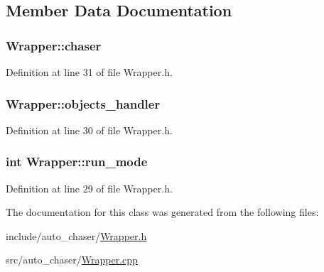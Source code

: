\subsection{Member Data Documentation}
\subsubsection[{\texorpdfstring{chaser}{chaser}}]{ Wrapper\+::chaser}\hypertarget{class_wrapper_a750309ad3470e20a80e9d72b0d7e34cb}{}\label{class_wrapper_a750309ad3470e20a80e9d72b0d7e34cb}


Definition at line 31 of file Wrapper.\+h.

\subsubsection[{\texorpdfstring{objects\+\_\+handler}{objects_handler}}]{ Wrapper\+::objects\+\_\+handler}\hypertarget{class_wrapper_a8cddd5ffbaeb5ab0b5d8d8d0c74f810f}{}\label{class_wrapper_a8cddd5ffbaeb5ab0b5d8d8d0c74f810f}


Definition at line 30 of file Wrapper.\+h.

\subsubsection[{\texorpdfstring{run\+\_\+mode}{run_mode}}]{\setlength{\rightskip}{0pt plus 5cm}int Wrapper\+::run\+\_\+mode}\hypertarget{class_wrapper_a4b4e8407edf38f99eb9d5a0cd4a0116b}{}\label{class_wrapper_a4b4e8407edf38f99eb9d5a0cd4a0116b}


Definition at line 29 of file Wrapper.\+h.



The documentation for this class was generated from the following files\+:\begin{DoxyCompactItemize}
\item 
include/auto\+\_\+chaser/\hyperlink{_wrapper_8h}{Wrapper.\+h}\item 
src/auto\+\_\+chaser/\hyperlink{_wrapper_8cpp}{Wrapper.\+cpp}\end{DoxyCompactItemize}
